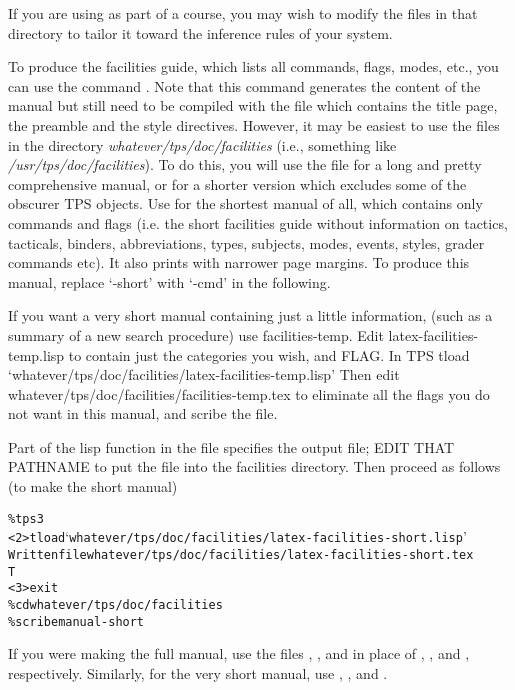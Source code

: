 If you are using {\ETPS} as part of a course, you may wish to modify
the files in that directory to tailor it toward the inference rules
of your system.

To produce the facilities guide, which lists all commands, flags, modes,
etc., you can use the {\TPS} command . Note that this command generates the content of the manual but still need to be compiled with the  file which contains the title page, the preamble and the style directives.
However, it may be easiest to use the
files in the directory {\it whatever/tps/doc/facilities}
(i.e., something like {\it /usr/tps/doc/facilities}). To do this,
you will use the file  for a long and pretty comprehensive
manual, or  for a shorter version which excludes some of the
obscurer TPS objects.
Use  for the shortest manual of all, which contains only commands
and flags (i.e. the short facilities guide
without information on tactics, tacticals, binders, abbreviations, types,
subjects, modes, events, styles, grader commands etc). It also prints with
narrower page margins. To produce this manual, replace `-short'
with `-cmd' in the following. 

If you want a very short manual containing just a little information,
(such as a summary of a new search procedure) use facilities-temp. Edit
latex-facilities-temp.lisp to contain just the categories you wish, and
FLAG. In TPS
tload `whatever/tps/doc/facilities/latex-facilities-temp.lisp'
Then edit whatever/tps/doc/facilities/facilities-temp.tex
to eliminate all the flags you do not want in this manual, and
scribe the file.

Part of the lisp function in the file specifies the output file; EDIT
THAT PATHNAME to put the file into the facilities directory.
Then proceed as follows (to make the short manual)
\begin{alltt}
\% tps3
<2>tload `whatever/tps/doc/facilities/latex-facilities-short.lisp'
Written file whatever/tps/doc/facilities/latex-facilities-short.tex
T
<3>exit
\% cd whatever/tps/doc/facilities
\% scribe manual-short
\end{alltt}

If you were making the full manual, use the files ,
, and  in place of ,
, and , respectively. Similarly,
for the very short manual, use ,
, and .

